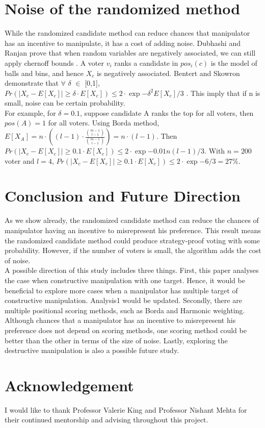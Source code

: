 \documentclass[letterpaper]{article} %
\begin{document}
\section{Noise of the randomized method}
While the randomized candidate method can reduce chances that manipulator has an incentive to manipulate, it has a cost of adding noise. Dubhashi and Ranjan prove that when random variables are negatively associated, we can still apply chernoff bounds \cite{BRICS}. A voter $v_i$ ranks a candidate in $pos_i(c)$ is the model of balls and bins, and hence $X_c$ is negatively associated. Bentert and Skowron demonstrate that $\forall$ $\delta$ $\in$ [0,1], $Pr(|X_c-E[X_c]| \geq \delta\cdot E[X_c]) \leq 2\cdot\exp{-\delta^2E[X_c]/3} $ \cite{Skowron}. This imply that if n is small, noise can be certain probability. \\
For example, for $\delta = 0.1$,  suppose candidate A ranks the top for all voters, then $pos(A) = 1$ for all voters. Using Borda method, $E[X_A]=n\cdot((l-1)\cdot \frac{\binom{m-1}{l-1}}{\binom{m-1}{l-1}}) = n\cdot(l-1).$ Then $Pr(|X_c-E[X_c]| \geq 0.1\cdot E[X_c]) \leq 2\cdot\exp{-0.01n(l-1)/3} $.
With $n=200$ voter and $l=4$, $Pr(|X_c-E[X_c]| \geq 0.1\cdot E[X_c]) \leq 2\cdot\exp{-6/3} = 27\%$.


\section{Conclusion and Future Direction}
As we show already, the randomized candidate method can reduce the chances of manipulator having an incentive to misrepresent his preference. This result means the randomized candidate method could produce strategy-proof voting with some probability. However, if the number of voters is small, the algorithm adds the cost of noise.\\
A possible direction of this study includes three things. First, this paper analyses the case when constructive manipulation with one target. Hence, it would be beneficial to explore more cases when a manipulator has multiple target of constructive manipulation. Analysis1 would be updated.
Secondly, there are multiple positional scoring methods, such as Borda and Harmonic weighting. Although chances that a manipulator has an incentive to misrepresent his preference does not depend on scoring methods, one scoring method could be better than the other in terms of the size of noise. Lastly, exploring the destructive manipulation is also a possible future study.


\section{Acknowledgement}
I would like to thank Professor Valerie King and Professor Nishant Mehta for their continued mentorship and advising throughout this project.




\end{document}
